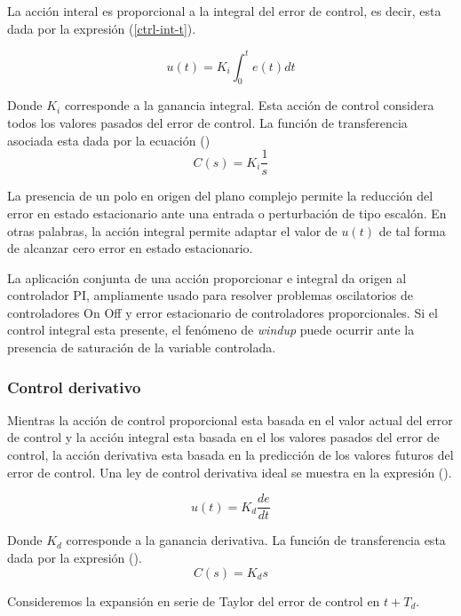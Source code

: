 La acción interal es proporcional a la integral del error de control, es decir, esta dada por la expresión (\ref{ctrl-int-t}).

\begin{equation}\label{ctrl-int-t}
u(t)=K_i \int_{0}^{t}e(t)dt 
\end{equation}

Donde $K_i$ corresponde a la ganancia integral. Esta acción de control considera todos los valores pasados del error de control. La función de transferencia asociada esta dada por la ecuación ()
\begin{equation}\label{ctrl-int}
C(s)=K_i\frac{1}{s}
\end{equation}

La presencia de un polo en origen del plano complejo permite la reducción del error en estado estacionario ante una entrada o perturbación de tipo escalón. En otras palabras, la acción integral permite adaptar el valor de $u(t)$ de tal forma de alcanzar cero error en estado estacionario.

La aplicación conjunta de una acción proporcionar e integral da origen al controlador PI, ampliamente usado para resolver problemas oscilatorios de controladores On Off y error estacionario de controladores proporcionales. Si el control integral esta presente, el fenómeno de \textit{windup} puede ocurrir ante la presencia de saturación de la variable controlada.

\subsubsection{Control derivativo}

Mientras la acción de control proporcional esta basada en el valor actual del error de control y la acción integral esta basada en el los valores pasados del error de control, la acción derivativa esta basada en la predicción de los valores futuros del error de control. Una ley de control derivativa ideal se muestra en la expresión ().

\begin{equation}
u(t) = K_d \frac{de}{dt}
\end{equation}

Donde $K_d$ corresponde a la ganancia derivativa. La función de transferencia esta dada por la expresión ().
\begin{equation}
C(s) = K_d s
\end{equation}

Consideremos la expansión en serie de Taylor del error de control en $t + T_d$.

